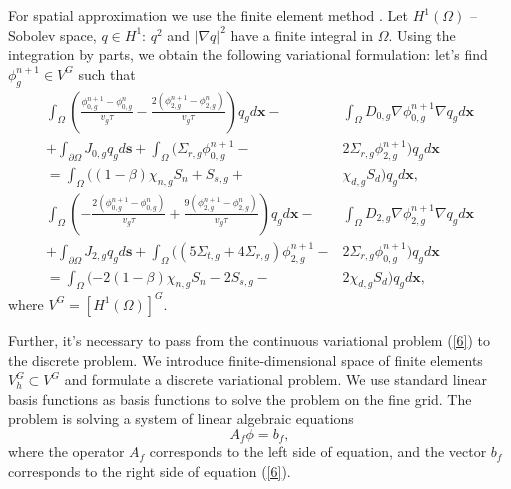\documentclass[authoryear]{elsarticle}
\begin{document}
For spatial approximation we use the finite element method \cite{quarteroni}.
Let $H^1(\Omega)$ -- Sobolev space, $q \in H^1$: $q^2$ and $\vert\nabla q\vert^2$ have a finite integral in $\Omega$. 
Using the integration by parts, we obtain the following variational formulation: let's find $\phi^{n+1}_g \in V^G$ such that
\begin{equation}\label{6}
\begin{split}
	\int_{\Omega} 
		\left( 
			\frac{\phi^{n+1}_{0,g} - \phi^{n}_{0,g}}{v_g \tau} - 
			\frac{2(\phi^{n+1}_{2,g} - \phi^{n}_{2,g})}{v_g \tau} 
		\right) q_g d\bm{x} - & %
	\int_{\Omega} D_{0,g} \nabla \phi^{n+1}_{0,g} \nabla q_g d\bm{x} \\
	+ \int_{\partial\Omega} J_{0,g} q_g d\bm{s} + 
	\int_{\Omega}
		(
			\Sigma_{r,g} \phi^{n+1}_{0,g} - & %
			2\Sigma_{r,g} \phi^{n+1}_{2,g} 
		) q_g d\bm{x} \\
	= \int_{\Omega} 
		(
			(1 - \beta) \chi_{n,g} S_{n} + 
			 S_{s,g} + & %
			 \chi_{d,g} S_d 
		) q_g d\bm{x}, \\
	\int_{\Omega} 
		\left( 
			- \frac{2(\phi^{n+1}_{0,g} - \phi^{n}_{0,g})}{v_g \tau} + 
			\frac{9(\phi^{n+1}_{2,g} - \phi^{n}_{2,g})}{v_g \tau} 
		\right) q_g d\bm{x} - & %
	\int_{\Omega} D_{2,g} \nabla \phi^{n+1}_{2,g} \nabla  q_g d\bm{x} \\
	+ \int_{\partial\Omega} J_{2,g} q_g d\bm{s} + 
	\int_{\Omega} 
		( 
			(5 \Sigma_{t,g} + 
			4 \Sigma_{r,g}) \phi^{n+1}_{2,g} - & %
			2\Sigma_{r,g} \phi^{n+1}_{0,g} 
		) q_g d\bm{x} \\
	= \int_{\Omega}
		( 
			- 2(1 - \beta) \chi_{n,g} S_{n} - 
			2S_{s,g} - & %
			2\chi_{d,g} S_d 
		) q_g d\bm{x},
\end{split}
\end{equation}
where $V^G=[H^1(\Omega)]^G$.

Further, it's necessary to pass from the continuous variational problem (\ref{6}) to the discrete problem. 
We introduce finite-dimensional space of finite elements $V^G_h \subset V^G$ and formulate a discrete variational problem. 
We use standard linear basis functions as basis functions to solve the problem on the fine grid.
The problem is solving a system of linear algebraic equations
\begin{equation}\label{7}
	A_f \phi = b_f,
\end{equation}
where the operator $A_f$ corresponds to the left side of equation, and the vector $b_f$ corresponds to the right side of equation (\ref{6}).
\end{document}
